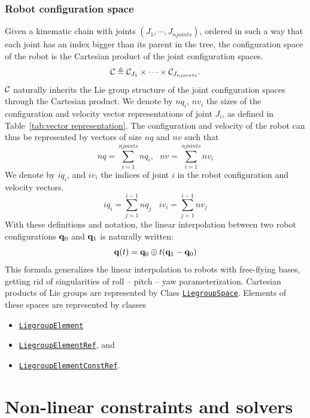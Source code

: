 \subsubsection{Robot configuration space}

Given a kinematic chain with joints $(J_1, \cdots, J_{njoints})$, ordered in such
a way that each joint has an index bigger than its parent in the tree, the configuration space of the robot is the Cartesian product of the joint configuration spaces.
$$
\mathcal{C} \triangleq \mathcal{C}_{J_1}\times \cdots \times \mathcal{C}_{J_{njoints}}.
$$
$\mathcal{C}$ naturally inherits the Lie group structure of the joint configuration spaces through the Cartesian product.
We denote by $nq_i$, $nv_i$ the sizes of the configuration and velocity vector representations of joint $J_i$, as defined in Table~\ref{tab:vector representation}.
The configuration and velocity of the robot can thus be represented by vectors of size $nq$ and $nv$ such that
$$
nq = \sum_{i=1}^{njoints} nq_i, \ \ \ nv = \sum_{i=1}^{njoints} nv_i
$$
We denote by $iq_i$, and $iv_i$ the indices of joint $i$ in the robot configuration and velocity vectors.
$$
iq_i = \sum_{j=1}^{i-1} nq_j\ \ \ \ iv_i = \sum_{j=1}^{i-1} nv_j
$$
With these definitions and notation, the linear interpolation between two robot
configurations $\mathbf{q}_0$ and $\mathbf{q}_1$ is naturally written:
$$
\mathbf{q}(t) = \mathbf{q}_0 \oplus t (\mathbf{q}_1 - \mathbf{q}_0)
$$
This formula generalizes the linear interpolation to robots with free-flying bases, getting rid of singularities of roll -- pitch -- yaw parameterization.
Cartesian products of Lie groups are represented by Class \href{https://gepettoweb.laas.fr/hpp/hpp-pinocchio/doxygen-html/classhpp_1_1pinocchio_1_1LiegroupSpace.html}{\texttt{LiegroupSpace}}. Elements of these spaces are represented by classes
\begin{itemize}
\item \href{https://gepettoweb.laas.fr/hpp/hpp-pinocchio/doxygen-html/classhpp_1_1pinocchio_1_1LiegroupElementBase.html}{\texttt{LiegroupElement}}
\item \href{https://gepettoweb.laas.fr/hpp/hpp-pinocchio/doxygen-html/classhpp_1_1pinocchio_1_1LiegroupElementBase.html}{\texttt{LiegroupElementRef}}, and
\item \href{https://gepettoweb.laas.fr/hpp/hpp-pinocchio/doxygen-html/classhpp_1_1pinocchio_1_1LiegroupElementBase.html}{\texttt{LiegroupElementConstRef}}.
  \end{itemize}

\section{Non-linear constraints and solvers}\label{sec:constraints}

